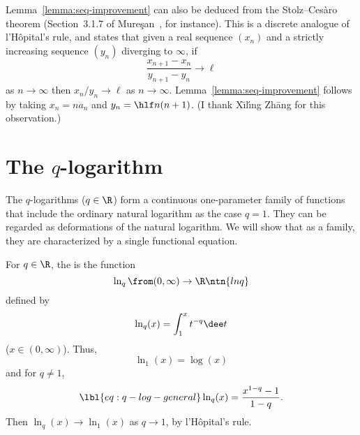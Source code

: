 \begin{remark}
Lemma~\ref{lemma:seq-improvement} can also be deduced from the
Stolz--Ces\`aro%
%
%
% 
theorem (Section~3.1.7 of Mure\c{s}an~\cite{Mure}, for
instance).  This is a discrete analogue of l'H\^opital's rule, and states
that given a real sequence $(x_n)$ and a strictly increasing sequence
$(y_n)$ diverging to $\infty$, if
\[
\frac{x_{n + 1} - x_n}{y_{n + 1} - y_n} \to \ell
\]
as $n \to \infty$ then $x_n/y_n \to \ell$ as $n \to \infty$.
Lemma~\ref{lemma:seq-improvement} follows by taking $x_n = na_n$ and $y_n =
\hlf n(n + 1)$.  (I thank X\={\i}l\'{\i}ng Zh\={a}ng for this observation.)
\end{remark}


\section{The $q$-logarithm}


The $q$-logarithms ($q \in \R$) form a continuous one-parameter family of
functions that include the ordinary natural logarithm as the case $q = 1$.
They can be regarded as deformations of the natural logarithm.  We will
show that as a family, they are characterized by a single functional
equation.

For $q \in \R$, the 
is the function 
\[
\ln_q \from (0, \infty) \to \R
\ntn{lnq}
\]
defined by
\[
\ln_q(x) 
=
\int_1^x t^{-q} \dee t
\]
($x \in (0, \infty)$).  Thus, 
\[
\ln_1(x) = \log(x)
\]
and for $q \neq 1$,
% 
\begin{equation}
\lbl{eq:q-log-general}
\ln_q(x)
=
\frac{x^{1 - q} - 1}{1 - q}.
\end{equation}
% 
Then $\ln_q(x) \to \ln_1(x)$ as $q \to 1$, by 
l'H\^opital's rule.

